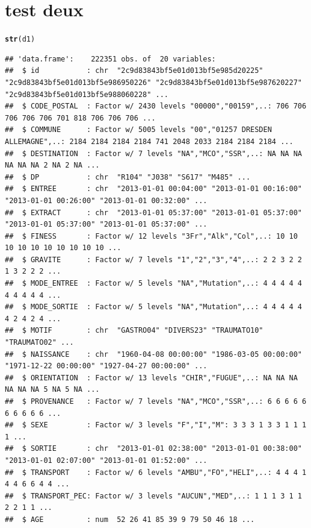 \documentclass[12pt,english,french,twoside]{report}\usepackage[]{graphicx}\usepackage[]{color}
\makeatletter
\newcommand{\hlkwd}[1]{\textcolor[rgb]{0.737,0.353,0.396}{\textbf{#1}}}%
\newenvironment{kframe}{%
 \def\at@end@of@kframe{}%
 \ifinner\ifhmode%
  \def\at@end@of@kframe{\end{minipage}}%
  \begin{minipage}{\columnwidth}%
 \fi\fi%
 \def\FrameCommand##1{\hskip\@totalleftmargin \hskip-\fboxsep
 \colorbox{shadecolor}{##1}\hskip-\fboxsep
     \hskip-\linewidth \hskip-\@totalleftmargin \hskip\columnwidth}%
 \MakeFramed {\advance\hsize-\width
   \@totalleftmargin\z@ \linewidth\hsize
   \@setminipage}}%
 {\par\unskip\endMakeFramed%
 \at@end@of@kframe}
\newenvironment{knitrout}{}{} %
\makeatother
\begin{document}
\chapter{test deux}
\begin{knitrout}
\color{fgcolor}\begin{kframe}
\begin{alltt}

\hlkwd{str}(d1)
\end{alltt}
\begin{verbatim}
## 'data.frame':	222351 obs. of  20 variables:
##  $ id           : chr  "2c9d83843bf5e01d013bf5e985d20225" "2c9d83843bf5e01d013bf5e986950226" "2c9d83843bf5e01d013bf5e987620227" "2c9d83843bf5e01d013bf5e988060228" ...
##  $ CODE_POSTAL  : Factor w/ 2430 levels "00000","00159",..: 706 706 706 706 706 701 818 706 706 706 ...
##  $ COMMUNE      : Factor w/ 5005 levels "00","01257 DRESDEN ALLEMAGNE",..: 2184 2184 2184 2184 741 2048 2033 2184 2184 2184 ...
##  $ DESTINATION  : Factor w/ 7 levels "NA","MCO","SSR",..: NA NA NA NA NA NA 2 NA 2 NA ...
##  $ DP           : chr  "R104" "J038" "S617" "M485" ...
##  $ ENTREE       : chr  "2013-01-01 00:04:00" "2013-01-01 00:16:00" "2013-01-01 00:26:00" "2013-01-01 00:32:00" ...
##  $ EXTRACT      : chr  "2013-01-01 05:37:00" "2013-01-01 05:37:00" "2013-01-01 05:37:00" "2013-01-01 05:37:00" ...
##  $ FINESS       : Factor w/ 12 levels "3Fr","Alk","Col",..: 10 10 10 10 10 10 10 10 10 10 ...
##  $ GRAVITE      : Factor w/ 7 levels "1","2","3","4",..: 2 2 3 2 2 1 3 2 2 2 ...
##  $ MODE_ENTREE  : Factor w/ 5 levels "NA","Mutation",..: 4 4 4 4 4 4 4 4 4 4 ...
##  $ MODE_SORTIE  : Factor w/ 5 levels "NA","Mutation",..: 4 4 4 4 4 4 2 4 2 4 ...
##  $ MOTIF        : chr  "GASTRO04" "DIVERS23" "TRAUMATO10" "TRAUMATO02" ...
##  $ NAISSANCE    : chr  "1960-04-08 00:00:00" "1986-03-05 00:00:00" "1971-12-22 00:00:00" "1927-04-27 00:00:00" ...
##  $ ORIENTATION  : Factor w/ 13 levels "CHIR","FUGUE",..: NA NA NA NA NA NA 5 NA 5 NA ...
##  $ PROVENANCE   : Factor w/ 7 levels "NA","MCO","SSR",..: 6 6 6 6 6 6 6 6 6 6 ...
##  $ SEXE         : Factor w/ 3 levels "F","I","M": 3 3 3 1 3 3 1 1 1 1 ...
##  $ SORTIE       : chr  "2013-01-01 02:38:00" "2013-01-01 00:38:00" "2013-01-01 02:07:00" "2013-01-01 01:52:00" ...
##  $ TRANSPORT    : Factor w/ 6 levels "AMBU","FO","HELI",..: 4 4 4 1 4 4 6 6 4 4 ...
##  $ TRANSPORT_PEC: Factor w/ 3 levels "AUCUN","MED",..: 1 1 1 3 1 1 2 2 1 1 ...
##  $ AGE          : num  52 26 41 85 39 9 79 50 46 18 ...
\end{verbatim}

\end{kframe}
\end{knitrout}
\end{document}
